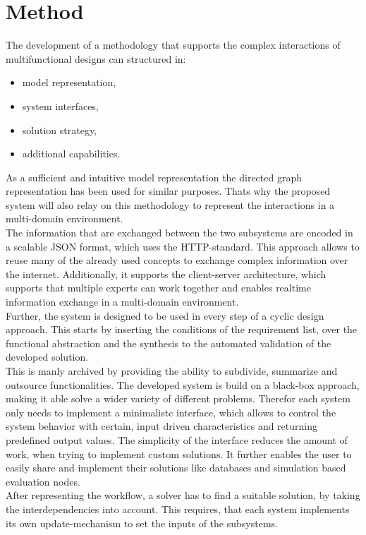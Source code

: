 \section{Method}
The development of a methodology that supports the complex interactions of multifunctional designs can structured in:
\begin{itemize}
    \item model representation,
    \item system interfaces,
    \item solution strategy,
    \item additional capabilities.
\end{itemize}
As a sufficient and intuitive model representation the directed graph representation has been used for similar purposes.
Thats why the proposed system will also relay on this methodology 
to represent the interactions in a multi-domain environment.\\
The information that are exchanged between the two subsystems
are encoded in a scalable JSON format, which uses the HTTP-standard.
This approach allows to reuse many of the already used concepts to exchange complex information over the internet.
Additionally, it supports the client-server architecture, 
which supports that multiple experts can work together and
enables realtime information exchange in a multi-domain environment.\\
Further, the system is designed to be used in every step of a cyclic design approach.
This starts by inserting the conditions of the requirement list, 
over the functional abstraction and the synthesis to the automated validation of the developed solution.\\
This is manly archived by providing the ability to subdivide, summarize and outsource functionalities. 
The developed system is build on a black-box approach, making it able solve a wider variety of different problems.
Therefor each system only needs to implement a minimalistc interface, 
which allows to control the system behavior with certain, input driven characteristics and returning predefined output values.
The simplicity of the interface reduces the amount of work, when trying to implement custom solutions.
It further enables the user to easily share and implement their solutions like databases and simulation based evaluation nodes.\\
After representing the workflow, a solver has to find a suitable solution, by taking the interdependencies into account.
This requires, that each system implements its own update-mechanism to set the inputs of the subsystems.

